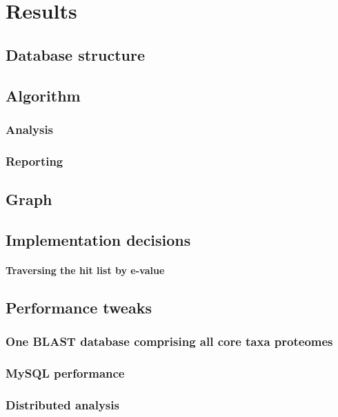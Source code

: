 \documentclass[a4paper,12pt]{scrreprt}
\begin{document}
\chapter{Results}
	
	\section{Database structure}
		
	\section{Algorithm}
		
		\subsection{Analysis}
			
		\subsection{Reporting}
			
	\section{Graph}
		
	\section{Implementation decisions}
		\subsubsection{Traversing the hit list by e-value}
			
	\section{Performance tweaks}
		\subsection{One BLAST database comprising all core taxa proteomes}
			
		\subsection{MySQL performance}
			
		\subsection{Distributed analysis}
			
\end{document}
